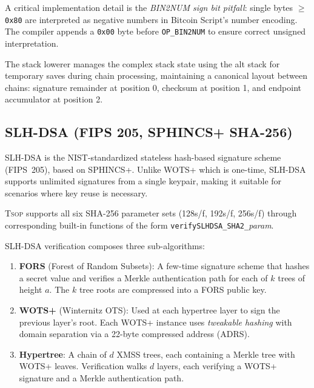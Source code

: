 \documentclass[11pt,a4paper]{article}
\newcommand{\op}[1]{\texttt{OP\_#1}}
\newcommand{\tsop}{\textsc{Tsop}}
\begin{document}
A critical implementation detail is the \emph{BIN2NUM sign bit pitfall}:
single bytes $\geq$ \texttt{0x80} are interpreted as negative numbers in
Bitcoin Script's number encoding. The compiler appends a \texttt{0x00} byte
before \op{BIN2NUM} to ensure correct unsigned interpretation.

The stack lowerer manages the complex stack state using the alt stack for
temporary saves during chain processing, maintaining a canonical layout
between chains: signature remainder at position 0, checksum at position 1,
and endpoint accumulator at position 2.

\subsection{SLH-DSA (FIPS 205, SPHINCS+ SHA-256)}
\label{sec:slhdsa}

SLH-DSA is the NIST-standardized stateless hash-based signature scheme
(FIPS~205), based on SPHINCS+. Unlike WOTS+ which is one-time, SLH-DSA
supports unlimited signatures from a single keypair, making it suitable
for scenarios where key reuse is necessary.

\tsop{} supports all six SHA-256 parameter sets (128s/f, 192s/f, 256s/f)
through corresponding built-in functions of the form
\mbox{\texttt{verifySLHDSA\_SHA2\_}\textit{param}}.

SLH-DSA verification composes three sub-algorithms:
\begin{enumerate}[nosep]
  \item \textbf{FORS} (Forest of Random Subsets): A few-time signature
    scheme that hashes a secret value and verifies a Merkle authentication
    path for each of $k$ trees of height $a$. The $k$ tree roots are
    compressed into a FORS public key.
  \item \textbf{WOTS+} (Winternitz OTS): Used at each hypertree layer
    to sign the previous layer's root. Each WOTS+ instance uses
    \emph{tweakable hashing} with domain separation via a 22-byte
    compressed address (ADRS).
  \item \textbf{Hypertree}: A chain of $d$ XMSS trees, each containing
    a Merkle tree with WOTS+ leaves. Verification walks $d$ layers,
    each verifying a WOTS+ signature and a Merkle authentication path.
\end{enumerate}
\end{document}
